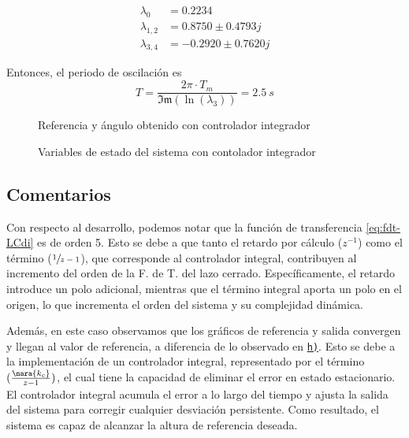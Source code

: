 \begin{align*}
  \lambda_{0} &= 0.2234\\
  \lambda_{1,2} &= 0.8750 \pm 0.4793j\\
  \lambda_{3,4} &= -0.2920 \pm 0.7620j
\end{align*}

Entonces, el periodo de oscilación es
\begin{equation}
    T = \frac{2\pi \cdot T_{m}}{\mathfrak{Im}(\ln(\lambda_{3}))} = 2.5\ \unit{s} 
\end{equation}

\begin{figure}[h]
    \centering
    
    \caption{Referencia y ángulo obtenido con controlador integrador}\label{fig:psi-int-disc-marge}
\end{figure}

\begin{figure}[h]
  \centering
  
  \caption{Variables de estado del sistema con contolador integrador}\label{fig:estado-int-disc-marge}
\end{figure}
  
\FloatBarrier
\subsection{Comentarios}

Con respecto al desarrollo, podemos notar que la función de transferencia 
\eqref{eq:fdt-LCdi} es de orden 5. Esto se debe a que tanto el retardo por 
cálculo ($z^{-1}$) como el término ($\sfrac{1}{z-1}$), que corresponde al 
controlador integral, contribuyen al incremento del orden de la F. de T. del 
lazo cerrado. Específicamente, el retardo introduce un polo adicional, mientras 
que el término integral aporta un polo en el origen, lo que incrementa el orden 
del sistema y su complejidad dinámica.

Además, en este caso observamos que los gráficos de referencia y salida 
convergen y llegan al valor de referencia, a diferencia de lo observado en 
\hyperref[pregunta-h]{\texttt{h)}}. Esto se debe a la implementación de un 
controlador integral, representado por el término $(\frac{\nara{k_c}}{z-1}
)$, el cual tiene la capacidad de eliminar el error en estado 
estacionario. El controlador integral acumula el error a lo largo del tiempo y 
ajusta la salida del sistema para corregir cualquier desviación persistente. 
Como resultado, el sistema es capaz de alcanzar la altura de referencia deseada.

